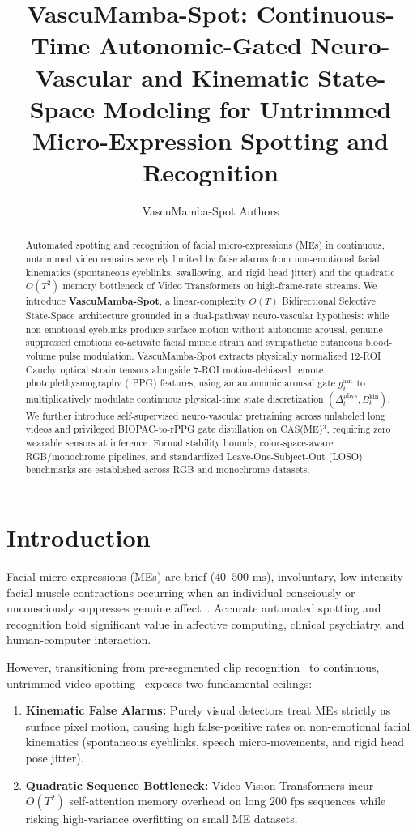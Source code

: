 \documentclass[10pt,twocolumn,letterpaper]{article}
\title{\textbf{VascuMamba-Spot: Continuous-Time Autonomic-Gated Neuro-Vascular and Kinematic State-Space Modeling for Untrimmed Micro-Expression Spotting and Recognition}}
\author{VascuMamba-Spot Authors}
\date{}
\begin{document}
\maketitle

\begin{abstract}
Automated spotting and recognition of facial micro-expressions (MEs) in continuous, untrimmed video remains severely limited by false alarms from non-emotional facial kinematics (spontaneous eyeblinks, swallowing, and rigid head jitter) and the quadratic $O(T^2)$ memory bottleneck of Video Transformers on high-frame-rate streams. We introduce \textbf{VascuMamba-Spot}, a linear-complexity $O(T)$ Bidirectional Selective State-Space architecture grounded in a dual-pathway neuro-vascular hypothesis: while non-emotional eyeblinks produce surface motion without autonomic arousal, genuine suppressed emotions co-activate facial muscle strain and sympathetic cutaneous blood-volume pulse modulation. VascuMamba-Spot extracts physically normalized 12-ROI Cauchy optical strain tensors alongside 7-ROI motion-debiased remote photoplethysmography (rPPG) features, using an autonomic arousal gate $g_t^{\mathrm{aut}}$ to multiplicatively modulate continuous physical-time state discretization $(\Delta_t^{\mathrm{phys}}, B_t^{\mathrm{kin}})$. We further introduce self-supervised neuro-vascular pretraining across unlabeled long videos and privileged BIOPAC-to-rPPG gate distillation on CAS(ME)$^3$, requiring zero wearable sensors at inference. Formal stability bounds, color-space-aware RGB/monochrome pipelines, and standardized Leave-One-Subject-Out (LOSO) benchmarks are established across RGB and monochrome datasets.
\end{abstract}

\section{Introduction}
Facial micro-expressions (MEs) are brief ($40\text{--}500\text{ ms}$), involuntary, low-intensity facial muscle contractions occurring when an individual consciously or unconsciously suppresses genuine affect~\cite{yan2014casme2,davison2018samm}. Accurate automated spotting and recognition hold significant value in affective computing, clinical psychiatry, and human-computer interaction.

However, transitioning from pre-segmented clip recognition~\cite{liong2019ststnet,gan2019offapexnet} to continuous, untrimmed video spotting~\cite{qu2017casme2sq,li2022casme3} exposes two fundamental ceilings:
\begin{enumerate}
  \item \textbf{Kinematic False Alarms:} Purely visual detectors treat MEs strictly as surface pixel motion, causing high false-positive rates on non-emotional facial kinematics (spontaneous eyeblinks, speech micro-movements, and rigid head pose jitter).
  \item \textbf{Quadratic Sequence Bottleneck:} Video Vision Transformers incur $O(T^2)$ self-attention memory overhead on long $200\text{ fps}$ sequences while risking high-variance overfitting on small ME datasets.
\end{enumerate}
\end{document}
